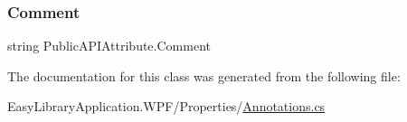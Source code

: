 \subsubsection{\texorpdfstring{Comment}{Comment}}
{\footnotesize\ttfamily string Public\+A\+P\+I\+Attribute.\+Comment\hspace{0.3cm}{\ttfamily [get]}}



The documentation for this class was generated from the following file\+:\begin{DoxyCompactItemize}
\item 
Easy\+Library\+Application.\+W\+P\+F/\+Properties/\mbox{\hyperlink{_annotations_8cs}{Annotations.\+cs}}\end{DoxyCompactItemize}
